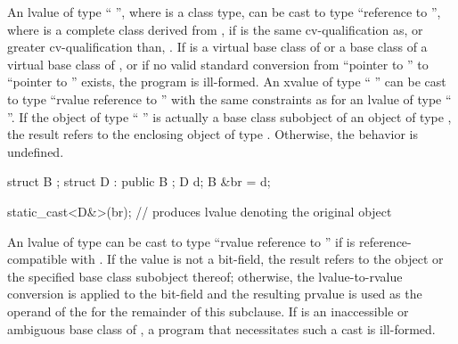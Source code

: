 \pnum
{}%
%
An lvalue of type `` '', where  is a class
type, can be cast to type ``reference to  '', where
 is a complete class derived from ,
if  is the
same cv-qualification as, or greater cv-qualification than,
. If  is a virtual base class of 
or a base class of a virtual base class of ,
or if no valid standard conversion from ``pointer to ''
to ``pointer to '' exists, the program is ill-formed.
An xvalue of type
`` '' can be cast to type ``rvalue reference to
 '' with the same constraints as for an lvalue of
type `` ''. If the object
of type `` '' is actually a base class subobject of an object
of type , the result refers to the enclosing object of type
. Otherwise, the behavior is undefined.
%
%
%
%
%
\begin{example}
\begin{codeblock}
struct B { };
struct D : public B { };
D d;
B &br = d;

static_cast<D&>(br);            // produces lvalue denoting the original  object
\end{codeblock}
\end{example}

\pnum
An lvalue
of type  can be cast to type ``rvalue
reference to '' if  is reference-compatible with
. If the value is not a bit-field,
the result refers to the object or the specified base class subobject
thereof; otherwise, the lvalue-to-rvalue conversion
is applied to the bit-field and the resulting prvalue is used as the
operand of the  for the remainder of this subclause.
If  is an inaccessible or
ambiguous base class of ,
a program that necessitates such a cast is ill-formed.


